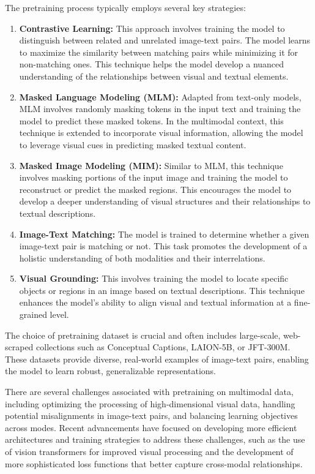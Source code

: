 The pretraining process typically employs several key strategies:
\begin{enumerate}
    \item \textbf{Contrastive Learning:} This approach involves training the model to distinguish between related and unrelated image-text pairs. The model learns to maximize the similarity between matching pairs while minimizing it for non-matching ones. This technique helps the model develop a nuanced understanding of the relationships between visual and textual elements.
    \item \textbf{Masked Language Modeling (MLM):} Adapted from text-only models, MLM involves randomly masking tokens in the input text and training the model to predict these masked tokens. In the multimodal context, this technique is extended to incorporate visual information, allowing the model to leverage visual cues in predicting masked textual content.
    \item \textbf{Masked Image Modeling (MIM):} Similar to MLM, this technique involves masking portions of the input image and training the model to reconstruct or predict the masked regions. This encourages the model to develop a deeper understanding of visual structures and their relationships to textual descriptions.
    \item \textbf{Image-Text Matching:} The model is trained to determine whether a given image-text pair is matching or not. This task promotes the development of a holistic understanding of both modalities and their interrelations.
    \item \textbf{Visual Grounding:} This involves training the model to locate specific objects or regions in an image based on textual descriptions. This technique enhances the model's ability to align visual and textual information at a fine-grained level.
\end{enumerate}

The choice of pretraining dataset is crucial and often includes large-scale, web-scraped collections such as Conceptual Captions, LAION-5B, or JFT-300M. These datasets provide diverse, real-world examples of image-text pairs, enabling the model to learn robust, generalizable representations.

There are several challenges associated with pretraining on multimodal data, including optimizing the processing of high-dimensional visual data, handling potential misalignments in image-text pairs, and balancing learning objectives across modes. Recent advancements have focused on developing more efficient architectures and training strategies to address these challenges, such as the use of vision transformers for improved visual processing and the development of more sophisticated loss functions that better capture cross-modal relationships.

